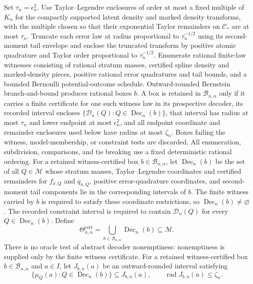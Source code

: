Set \(\tau_n=\epsilon_n^2\).  Use Taylor--Legendre enclosures of order at most a fixed multiple of \(K_n\) for the compactly supported latent density and marked density transforms, with the multiple chosen so that their exponential Taylor remainders on \(\mathcal C_*\) are at most \(\tau_n\).  Truncate each error law at radius proportional to \(\tau_n^{-1/2}\) using its second-moment tail envelope and enclose the truncated transform by positive atomic quadrature and Taylor order proportional to \(\tau_n^{-1/2}\).  Enumerate rational finite-law witnesses consisting of rational stratum masses, certified spline density and marked-density pieces, positive rational error quadratures and tail bounds, and a bounded Bernoulli potential-outcome schedule.  Outward-rounded Bernstein branch-and-bound produces rational boxes \(b\).  A box is retained in \(\mathscr B_{n,\alpha}\) only if it carries a finite certificate for one such witness law in its prospective decoder, its recorded interval encloses \(\{\mathscr D_n(Q):Q\in\operatorname{Dec}_n(b)\}\), that interval has radius at most \(\tau_n\) and lower endpoint at most \(\epsilon_n^2\), and all endpoint coordinate and remainder enclosures used below have radius at most \(\zeta_n\).  Boxes failing the witness, model-membership, or constraint tests are discarded.  All enumeration, subdivision, comparisons, and tie breaking use a fixed deterministic rational ordering.
For a retained witness-certified box \(b\in\mathscr B_{n,\alpha}\), let \(\operatorname{Dec}_n(b)\) be the set of all \(Q\in\mathcal M\) whose stratum masses, Taylor--Legendre coordinates and certified remainders for \(f_{x,Q}\) and \(q_{x,Q}\), positive error-quadrature coordinates, and second-moment tail components lie in the corresponding intervals of \(b\).  The finite witness carried by \(b\) is required to satisfy these coordinate restrictions, so \(\operatorname{Dec}_n(b)\neq\varnothing\).  The recorded constraint interval is required to contain \(\mathscr D_n(Q)\) for every \(Q\in\operatorname{Dec}_n(b)\).  Define
\[
 \Theta^{\mathrm{cert}}_{n,\alpha}
 =\bigcup_{b\in\mathscr B_{n,\alpha}}\operatorname{Dec}_n(b)\subseteq\mathcal M.
\]
There is no oracle test of abstract decoder nonemptiness: nonemptiness is supplied only by the finite witness certificate.
For a retained witness-certified box \(b\in\mathscr B_{n,\alpha}\) and \(a\in I\), let \(J_{b,n}(a)\) be an outward-rounded interval satisfying
\[
 \{\mu_Q(a):Q\in\operatorname{Dec}_n(b)\}
 \subseteq J_{b,n}(a),
 \qquad \operatorname{rad}J_{b,n}(a)\le\zeta_n.
\]
